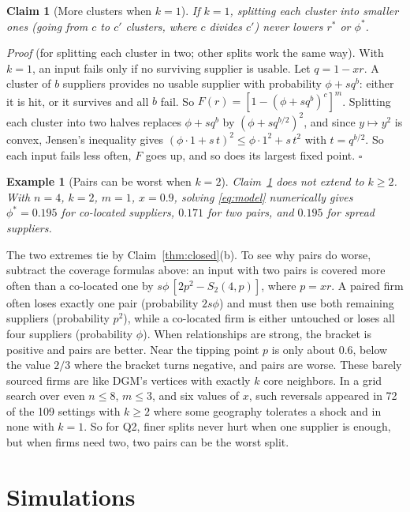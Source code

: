 \documentclass[10pt]{article}
\newtheorem{claim}{Claim}
\newtheorem{example}{Example}
\begin{document}
\begin{claim}[More clusters when $k=1$]\label{thm:mono}
If $k=1$, splitting each cluster into smaller ones (going from $c$ to $c'$ clusters, where $c$ divides $c'$) never lowers $r^*$ or $\phi^*$.
\end{claim}
\noindent\emph{Proof} (for splitting each cluster in two; other splits work the same way). With $k=1$, an input fails only if no surviving supplier is usable. Let $q=1-xr$. A cluster of $b$ suppliers provides no usable supplier with probability $\phi+sq^b$: either it is hit, or it survives and all $b$ fail. So $F(r)=[1-(\phi+sq^b)^c]^m$. Splitting each cluster into two halves replaces $\phi+sq^b$ by $(\phi+sq^{b/2})^2$, and since $y\mapsto y^2$ is convex, Jensen's inequality gives $(\phi\cdot1+s\,t)^2\le\phi\cdot1^2+s\,t^2$ with $t=q^{b/2}$. So each input fails less often, $F$ goes up, and so does its largest fixed point. $\square$

\begin{example}[Pairs can be worst when $k=2$]\label{prop:trap}
Claim~\ref{thm:mono} does not extend to $k\ge2$. With $n=4$, $k=2$, $m=1$, $x=0.9$, solving \eqref{eq:model} numerically gives $\phi^*=0.195$ for co-located suppliers, $0.171$ for two pairs, and $0.195$ for spread suppliers.
\end{example}
\noindent The two extremes tie by Claim~\ref{thm:closed}(b). To see why pairs do worse, subtract the coverage formulas above: an input with two pairs is covered more often than a co-located one by $s\phi\,[2p^2-S_2(4,p)]$, where $p=xr$. A paired firm often loses exactly one pair (probability $2s\phi$) and must then use both remaining suppliers (probability $p^2$), while a co-located firm is either untouched or loses all four suppliers (probability $\phi$). When relationships are strong, the bracket is positive and pairs are better. Near the tipping point $p$ is only about 0.6, below the value $2/3$ where the bracket turns negative, and pairs are worse. These barely sourced firms are like DGM's vertices with exactly $k$ core neighbors. In a grid search over even $n\le8$, $m\le3$, and six values of $x$, such reversals appeared in 72 of the 109 settings with $k\ge2$ where some geography tolerates a shock and in none with $k=1$. So for Q2, finer splits never hurt when one supplier is enough, but when firms need two, two pairs can be the worst split.

\section{Simulations}
\end{document}
